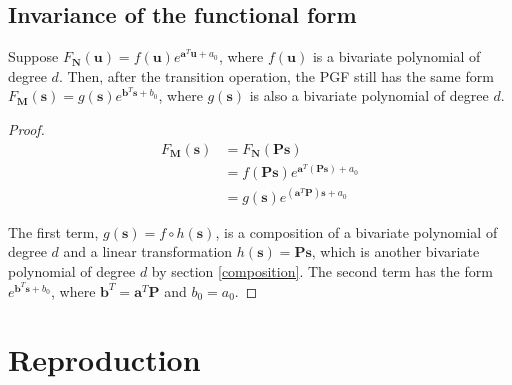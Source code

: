 \documentclass{article}
\begin{document}
\subsection{Invariance of the functional form}
Suppose $F_{\mathbf{N}}(\mathbf{u}) = f(\mathbf{u}) e^{\mathbf{a}^T \mathbf{u} + a_0}$, where $f(\mathbf{u})$ is a bivariate polynomial of degree $d$. Then, after the transition operation, the PGF still has the same form $F_{\mathbf{M}}(\mathbf{s}) = g(\mathbf{s}) e^{\mathbf{b}^T \mathbf{s} + b_0}$, where $g(\mathbf{s})$ is also a bivariate polynomial of degree $d$.

\begin{proof}
\begin{align*}
F_{\mathbf{M}}(\mathbf{s}) &=  F_{\mathbf{N}}(\mathbf{P} \mathbf{s}) \\
&= f(\mathbf{P} \mathbf{s}) e^{\mathbf{a}^T (\mathbf{\mathbf{P} \mathbf{s}}) + a_0} \\
&= g(\mathbf{s}) e^{(\mathbf{a}^T \mathbf{P}) \mathbf{s} + a_0}
\end{align*}

The first term, $g(\mathbf{s}) = f \circ h(\mathbf{s})$, is a composition of a bivariate polynomial of degree $d$ and a linear transformation $h(\mathbf{s}) = \mathbf{P} \mathbf{s}$, which is another bivariate polynomial of degree $d$ by section \ref{composition}. The second term has the form $e^{\mathbf{b}^T \mathbf{s} + b_0}$, where $\mathbf{b}^T = \mathbf{a}^T \mathbf{P}$ and $b_0 = a_0$.

\end{proof}

\section{Reproduction}
\end{document}
